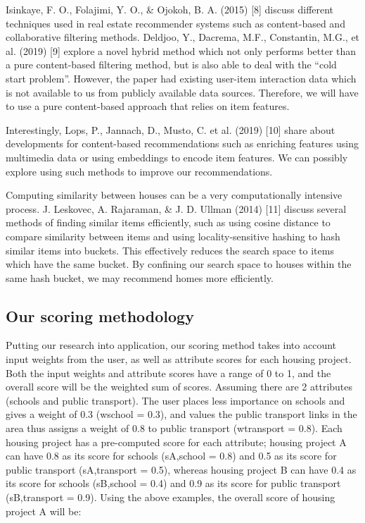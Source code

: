 \documentclass[a4paper, 11pt]{article}
\begin{document}
    Isinkaye, F. O., Folajimi, Y. O., \& Ojokoh, B. A. (2015) [8] discuss different techniques used in real estate recommender systems such as content-based and collaborative filtering methods. Deldjoo, Y., Dacrema, M.F., Constantin, M.G., et al. (2019) [9] explore a novel hybrid method which not only performs better than a pure content-based filtering method, but is also able to deal with the “cold start problem”. However, the paper had existing user-item interaction data which is not available to us from publicly available data sources. Therefore, we will have to use a pure content-based approach that relies on item features. 
    
    Interestingly, Lops, P., Jannach, D., Musto, C. et al. (2019) [10] share about developments for content-based recommendations such as enriching features using multimedia data or using embeddings to encode item features. We can possibly explore using such methods to improve our recommendations. 
    
    Computing similarity between houses can be a very computationally intensive process. J. Leskovec, A. Rajaraman, \& J. D. Ullman (2014) [11] discuss several methods of finding similar items efficiently, such as using cosine distance to compare similarity between items and using locality-sensitive hashing to hash similar items into buckets. This effectively reduces the search space to items which have the same bucket. By confining our search space to houses within the same hash bucket, we may recommend homes more efficiently. 

    \subsection{Our scoring methodology}
    
    Putting our research into application, our scoring method takes into account input weights from the user, as well as attribute scores for each housing project. Both the input weights and attribute scores have a range of 0 to 1, and the overall score will be the weighted sum of scores. Assuming there are 2 attributes (schools and public transport). The user places less importance on schools and gives a weight of  0.3 (wschool = 0.3), and values the public transport links in the area thus assigns a weight of 0.8 to public transport (wtransport = 0.8). Each housing project has a pre-computed score for each attribute; housing project A can have 0.8 as its score for schools (sA,school = 0.8) and 0.5 as its score for public transport (sA,transport = 0.5), whereas housing project B can have 0.4 as its score for schools (sB,school = 0.4) and 0.9 as its score for public transport (sB,transport = 0.9). Using the above examples, the overall score of housing project A will be:
    
\end{document}
